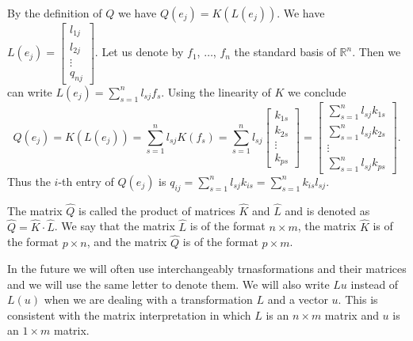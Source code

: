 By the definition of \( Q \) we have \( Q(e_j)=K(L(e_j)) \). We have \( L(e_j)=\left[\begin{array}{c}l_{1j}\\ l_{2j}\\\vdots\\ q_{nj}\end{array}\right]\). Let us denote by \( f_1 \), \( \dots \), \( f_n \) the standard basis of \( \mathbb R^n \). Then we can write \(  L(e_j)=\sum_{s=1}^n l_{sj}f_s \). Using the linearity of \( K \) we conclude \[Q(e_j)=K(L(e_j))=\sum_{s=1}^n l_{sj}K(f_s)=\sum_{s=1}^n l_{sj} \left[\begin{array}{c} k_{1s}\\k_{2s}\\\vdots\\ k_{ps} \end{array}\right]=\left[\begin{array}{c}\sum_{s=1}^n l_{sj}k_{1s}\\ \sum_{s=1}^n l_{sj}k_{2s}\\ \vdots\\ \sum_{s=1}^n l_{sj}k_{ps}\end{array}\right]. \] Thus the \( i \)-th entry of \( Q(e_j) \) is \(  q_{ij}=\sum_{s=1}^n l_{sj}k_{is}=\sum_{s=1}^nk_{is}l_{sj} \).

The matrix \( \hat Q \) is called the product of matrices \( \hat K \) and \( \hat L \) and is denoted as \( \hat Q=\hat K\cdot \hat L \). We say that the matrix \( \hat L \) is of the format \( n\times m \), the matrix \( \hat K \) is of the format \( p\times n \), and the matrix \( \hat Q \) is of the format \( p\times m \).

In the future we will often use interchangeably trnasformations and their matrices and we will use the same letter to denote them. We will also write \( Lu \) instead of \( L(u) \) when we are dealing with a transformation \( L \) and a vector \( u \). This is consistent with the matrix interpretation in which \( L \) is an \( n\times m \) matrix and \( u \) is an \( 1\times m \) matrix. 